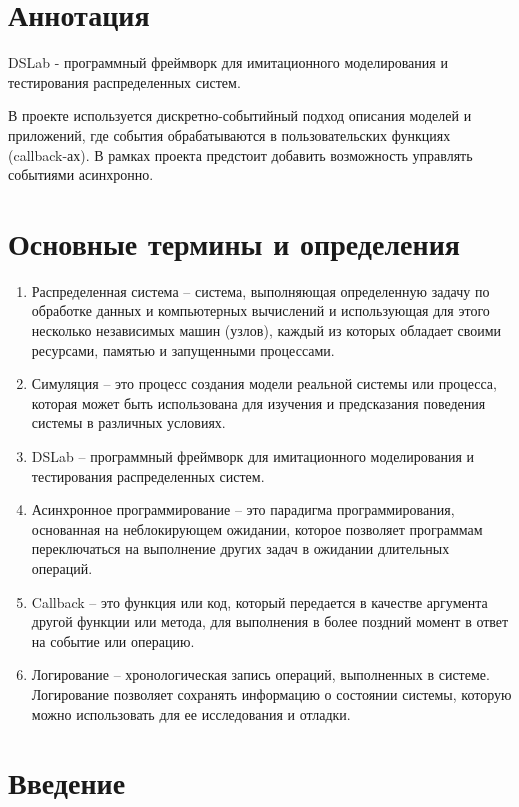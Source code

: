 
\section*{Аннотация}

DSLab - программный фреймворк для имитационного моделирования и тестирования распределенных систем.

В проекте используется дискретно-событийный подход описания моделей и приложений, где события обрабатываются в пользовательских функциях (callback-ах). В рамках проекта предстоит добавить возможность управлять событиями асинхронно.

\newpage

\section{Основные термины и определения}

\begin{enumerate}
    \item Распределенная система -- система, выполняющая определенную задачу по обработке данных и компьютерных вычислений и использующая для этого несколько независимых машин (узлов), каждый из которых обладает своими ресурсами, памятью и запущенными процессами.
    \item Симуляция -- это процесс создания модели реальной системы или процесса, которая может быть использована для изучения и предсказания поведения системы в различных условиях.
    \item DSLab -- программный фреймворк для имитационного моделирования и тестирования распределенных систем.
    \item Асинхронное программирование -- это парадигма программирования, основанная на неблокирующем ожидании, которое позволяет программам переключаться на выполнение других задач в ожидании длительных операций.
    \item Callback -- это функция или код, который передается в качестве аргумента другой функции или метода, для выполнения в более поздний момент в ответ на событие или операцию.
    \item Логирование -- хронологическая запись операций, выполненных в системе. Логирование позволяет сохранять информацию о состоянии системы, которую можно использовать для ее исследования и отладки.
\end{enumerate}

\newpage

\section{Введение}

